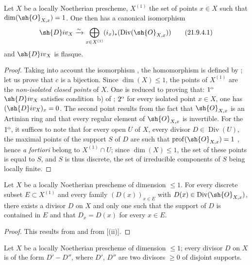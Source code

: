 \begin{proposition}[21.9.4]
\label{IV.21.9.4}
Let $X$ be a locally Noetherian prescheme, $X^{(1)}$ the set of points $x\in X$ such that $\dim(\sh{O}_{X,x})=1$.
One then has a canonical isomorphism
\[
\label{IV.21.9.4.1}
  \sh{D}iv_X\xrightarrow{\sim}\bigoplus_{x\in X^{(1)}}(i_x)_*(\operatorname{Div}(\sh{O}_{X,x}))
  \tag{21.9.4.1}
\]
and $\sh{D}iv_X$ is flasque.
\end{proposition}

\begin{proof}
Taking into account the isomorphism , the homomorphism  is defined by ;
let us prove that $c$ is a bijection.
Since $\dim(X)\leq 1$, the points of $X^{(1)}$ are the \emph{non-isolated closed points} of $X$.
One is reduced to proving that:
$1\textsuperscript{o}$ $\sh{D}iv_X$ satisfies condition~b) of ;
$2\textsuperscript{o}$ for every isolated point $x\in X$, one has $(\sh{D}iv_X)_x=0$.
The second point results from the fact that $\sh{O}_{X,x}$ is an Artinian ring and that every regular element of $\sh{O}_{X,x}$ is invertible.
For the $1\textsuperscript{o}$, it suffices to note that for every open $U$ of $X$, every divisor $D\in\operatorname{Div}(U)$, the maximal points of the support $S$ of $D$ are such that $\operatorname{prof}(\sh{O}_{X,x})=1$ , hence \emph{a fortiori} belong to $X^{(1)}\cap U$;
since $\dim(X)\leq 1$, the set of these points is equal to $S$, and $S$ is thus discrete, the set of irreducible components of $S$ being locally finite.
\end{proof}

\begin{corollary}[21.9.5]
\label{IV.21.9.5}
Let $X$ be a locally Noetherian prescheme of dimension $\leq 1$.
For every discrete subset $E\subset X^{(1)}$ and every family $(D(x))_{x\in E}$ with $D(x)\in\operatorname{Div}(\sh{O}_{X,x})$, there exists a divisor $D$ on $X$ and only one such that the support of $D$ is contained in $E$ and that $D_x=D(x)$ for every $x\in E$.
\end{corollary}

\begin{proof}
This results from  and from [(ii)].
\end{proof}

\begin{corollary}[21.9.6]
\label{IV.21.9.6}
Let $X$ be a locally Noetherian prescheme of dimension $\leq 1$;
every divisor $D$ on $X$ is of the form $D'-D''$, where $D'$, $D''$ are two divisors $\geq 0$ of disjoint supports.
\end{corollary}

